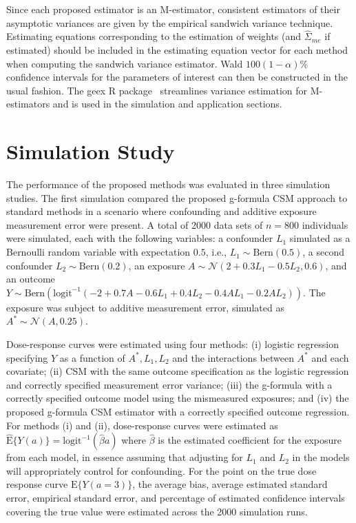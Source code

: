 \documentclass[useAMS,usenatbib,referee]{biom}
\begin{document}
Since each proposed estimator is an M-estimator, consistent estimators of their asymptotic variances are given by the empirical sandwich variance technique. Estimating equations corresponding to the estimation of weights (and $\hat{\Sigma}_{me}$ if estimated) should be included in the estimating equation vector for each method when computing the sandwich variance estimator. Wald $100(1-\alpha)\%$ confidence intervals for the parameters of interest can then be constructed in the usual fashion. The geex R package~\citep{saul2017} streamlines variance estimation for M-estimators and is used in the simulation and application sections.

\section{Simulation Study}

The performance of the proposed methods was evaluated in three simulation studies. The first simulation compared the proposed g-formula CSM approach to standard methods in a scenario where confounding and additive exposure measurement error were present. A total of 2000 data sets of $n = 800$ individuals were simulated, each with the following variables: a confounder $L_{1}$ simulated as a Bernoulli random variable with expectation $0.5$, i.e., $L_{1} \sim \text{Bern}(0.5)$, a second confounder $L_{2} \sim \text{Bern}(0.2)$, an exposure $A \sim \mathcal{N}(2 + 0.3L_{1} - 0.5L_{2}, 0.6)$, and an outcome $Y \sim \text{Bern}(\text{logit}^{-1}(-2 + 0.7A - 0.6L_{1} + 0.4L_{2} - 0.4AL_{1} - 0.2AL_{2}))$. The exposure was subject to additive measurement error, simulated as $A^{*} \sim \mathcal{N}(A, 0.25)$.

Dose-response curves were estimated using four methods: (i) logistic regression specifying $Y$ as a function of $A^{*}, L_{1}, L_{2}$ and the interactions between $A^{*}$ and each covariate; (ii) CSM with the same outcome specification as the logistic regression and correctly specified measurement error variance; (iii) the g-formula with a correctly specified outcome model using the mismeasured exposures; and (iv) the proposed g-formula CSM estimator with a correctly specified outcome regression. For methods (i) and (ii), dose-response curves were estimated as $\hat{\text{E}}\{ Y(a) \} = \text{logit}^{-1}(\hat{\beta} a)$ where $\hat{\beta}$ is the estimated coefficient for the exposure from each model, in essence assuming that adjusting for $L_{1}$ and $L_{2}$ in the models will appropriately control for confounding. For the point on the true dose response curve $\text{E}\{ Y(a = 3) \}$, the average bias, average estimated standard error, empirical standard error, and percentage of estimated confidence intervals covering the true value were estimated across the 2000 simulation runs.
\end{document}
